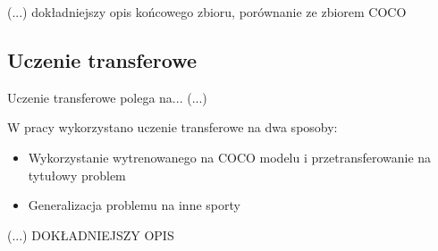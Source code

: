 (...) dokładniejszy opis końcowego zbioru, porównanie ze zbiorem COCO

\subsection{Uczenie transferowe}

Uczenie transferowe polega na... (...)

W pracy wykorzystano uczenie transferowe na dwa sposoby:

\begin{itemize}
	\item Wykorzystanie wytrenowanego na COCO modelu i przetransferowanie na tytułowy problem
	\item Generalizacja problemu na inne sporty
\end{itemize}

(...) DOKŁADNIEJSZY OPIS
